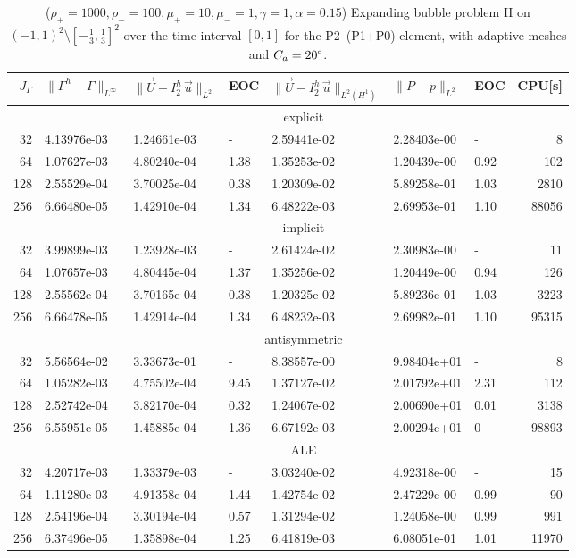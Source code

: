 \documentclass[a4paper,12pt,onecolumn]{article}
\newcommand{\errorXx}{\|\Gamma^h - \Gamma\|_{L^\infty}}
\newcommand{\LerrorUu}[1]{\|\vec U - I^h_{#1}\,\vec u\|_{L^2}}
\newcommand{\HerrorUu}[1]{\|\vec U - I^h_{#1}\,\vec u\|_{L^2(H^1)}}
\newcommand{\LerrorPp}{\|P - p\|_{L^2}}
\begin{document}
\begin{table}
\center
\hspace*{-3.25cm}
\begin{tabular}{rllllllr}
\hline
$J_\Gamma$ & $\errorXx$ & $\LerrorUu2$ & EOC & $\HerrorUu2$ & $\LerrorPp$ & EOC
& CPU[s] \\
\hline
& \multicolumn{7}{c}{explicit} \\
\hline
 32 & 4.13976e-03 & 1.24661e-03 &    - & 2.59441e-02 & 2.28403e-00 &    - &
8 \\
 64 & 1.07627e-03 & 4.80240e-04 & 1.38 & 1.35253e-02 & 1.20439e-00 & 0.92 &
102 \\
128 & 2.55529e-04 & 3.70025e-04 & 0.38 & 1.20309e-02 & 5.89258e-01 & 1.03 &
2810 \\
256 & 6.66480e-05 & 1.42910e-04 & 1.34 & 6.48222e-03 & 2.69953e-01 & 1.10 &
88056 \\
\hline
& \multicolumn{7}{c}{implicit} \\
\hline
 32 & 3.99899e-03 & 1.23928e-03 &    - & 2.61424e-02 & 2.30983e-00 &    - &
11 \\
 64 & 1.07657e-03 & 4.80445e-04 & 1.37 & 1.35256e-02 & 1.20449e-00 & 0.94 &
126 \\
128 & 2.55562e-04 & 3.70165e-04 & 0.38 & 1.20325e-02 & 5.89236e-01 & 1.03 &
3223 \\
256 & 6.66478e-05 & 1.42914e-04 & 1.34 & 6.48232e-03 & 2.69982e-01 & 1.10 &
95315 \\
\hline
& \multicolumn{7}{c}{antisymmetric} \\
\hline
 32 & 5.56564e-02 & 3.33673e-01 &    - & 8.38557e-00 & 9.98404e+01 &    - &
8 \\
 64 & 1.05282e-03 & 4.75502e-04 & 9.45 & 1.37127e-02 & 2.01792e+01 & 2.31 &
112 \\
128 & 2.52742e-04 & 3.82170e-04 & 0.32 & 1.24067e-02 & 2.00690e+01 & 0.01 &
3138 \\
256 & 6.55951e-05 & 1.45885e-04 & 1.36 & 6.67192e-03 & 2.00294e+01 &    0 &
98893 \\
\hline
& \multicolumn{7}{c}{ALE} \\
\hline
 32 & 4.20717e-03 & 1.33379e-03 &    - & 3.03240e-02 & 4.92318e-00 &    - &
15 \\
 64 & 1.11280e-03 & 4.91358e-04 & 1.44 & 1.42754e-02 & 2.47229e-00 & 0.99 &
90 \\
128 & 2.54196e-04 & 3.30194e-04 & 0.57 & 1.31294e-02 & 1.24058e-00 & 0.99 &
991 \\
256 & 6.37496e-05 & 1.35898e-04 & 1.25 & 6.41819e-03 & 6.08051e-01 & 1.01 &
11970 \\
\hline
\end{tabular}
\hspace*{-3.25cm}
\caption[Navier--Stokes expanding bubble II errors P2--(P1+P0)]
{($\rho_+ = 1000,\rho_- = 100,\mu_+ = 10,\mu_- =1,\gamma = 1,\alpha=0.15$)
Expanding bubble problem II on $(-1,1)^2\setminus[-\frac{1}{3},\frac{1}{3}]^2$
over the time interval $[0,1]$ for the P2--(P1+P0) element, with adaptive
meshes and $C_a=20\degree$.}
\label{tab:nsexpandingbubbleIIp2p1p0}
\end{table}
\end{document}
